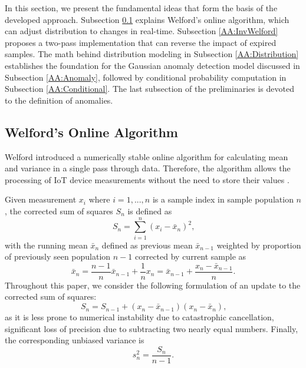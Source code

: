 In this section, we present the fundamental ideas that form the basis of the developed approach. Subsection \ref{AA:Welford} explains Welford's online algorithm, which can adjust distribution to changes in real-time. Subsection \ref{AA:InvWelford} proposes a two-pass implementation that can reverse the impact of expired samples. The math behind distribution modeling in Subsection \ref{AA:Distribution} establishes the foundation for the Gaussian anomaly detection model discussed in Subsection \ref{AA:Anomaly}, followed by conditional probability computation in Subsection \ref{AA:Conditional}. The last subsection of the preliminaries is devoted to the definition of anomalies.

\subsection{Welford's Online Algorithm}\label{AA:Welford}
Welford introduced a numerically stable online algorithm for calculating mean and variance in a single pass through data. Therefore, the algorithm allows the processing of IoT device measurements without the need to store their values \cite{Wel62}.

Given measurement \(x_i\) where \(i=1,...,n\) is a sample index in sample population \(n\), the corrected sum of squares \(S_n\) is defined as
\begin{equation}
S_n = \sum_{i=1}^n (x_i - \bar x_n)^2\text{,}\label{eq:sumsquares}
\end{equation}
with the running mean \(\bar x_n\) defined as previous mean \(\bar x_{n-1}\) weighted by proportion of previously seen population \(n-1\) corrected by current sample as
\begin{equation}
\bar x_n = \frac{n-1}{n} \bar x_{n-1} + \frac{1}{n}x_n = \bar x_{n-1} + \frac{x_n - \bar x_{n-1}}{n}\text{.}\label{eq:runmean}
\end{equation}
Throughout this paper, we consider the following formulation of an update to the corrected sum of squares:
\begin{equation}
S_n = S_{n-1} + (x_n - \bar x_{n-1})(x_n - \bar x_n)\text{,}\label{eq:upsumsquares}
\end{equation}
as it is less prone to numerical instability due to catastrophic cancellation, significant loss of precision due to subtracting two nearly equal numbers. Finally, the corresponding unbiased variance is
\begin{equation}
s^2_n = \frac{S_{n}}{n-1}\text{.}\label{eq:runvar}
\end{equation}

